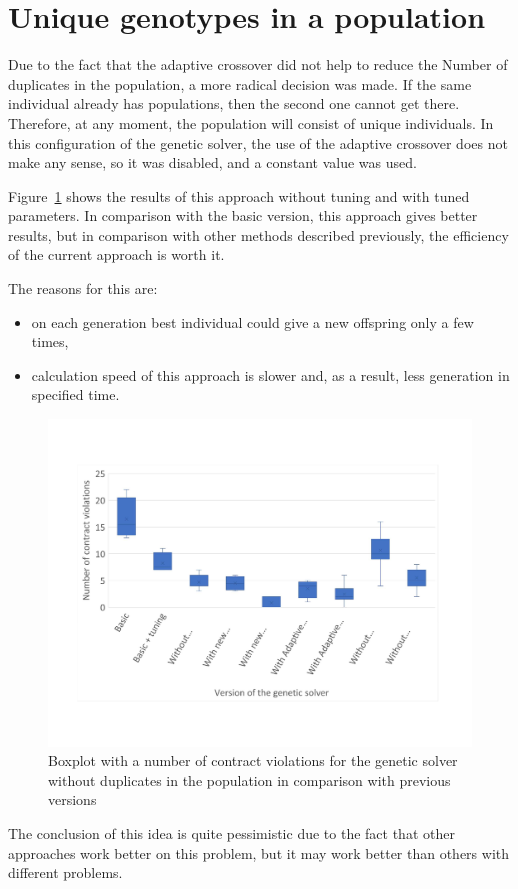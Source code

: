 \section{Unique genotypes in a population}
Due to the fact that the adaptive crossover did not help to reduce the Number of duplicates in the population, a more radical decision was made. If the same individual already has populations, then the second one cannot get there. Therefore, at any moment, the population will consist of unique individuals. In this configuration of the genetic solver, the use of the adaptive crossover does not make any sense, so it was disabled, and a constant value was used.

Figure~\ref{fig:boxplotsolverNoDuplicates} shows the results of this approach without tuning and with tuned parameters. In comparison with the basic version, this approach gives better results, but in comparison with other methods described previously, the efficiency of the current approach is worth it.

The reasons for this are:
\begin{itemize}
	\item on each generation best individual could give a new offspring only a few times, 
	\item calculation speed of this approach is slower and, as a result, less generation in specified time.
\end{itemize}


\begin{figure}
	\centering
	\includegraphics[width=\textwidth]{images/BoxPlotSolverNoDuplicates.pdf}
	\caption[Boxplot with a number of contract violations for the genetic solver without duplicates in the population in comparison with previous versions]{Boxplot with a number of contract violations for the genetic solver without duplicates in the population in comparison with previous versions}
	\label{fig:boxplotsolverNoDuplicates}
\end{figure}

The conclusion of this idea is quite pessimistic due to the fact that other approaches work better on this problem, but it may work better than others with different problems.
